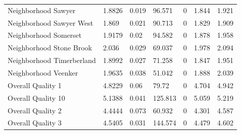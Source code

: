 \documentclass{article}
\begin{document}
\begin{table}[]
\begin{tabular}{lllllll}
		Neighborhood Sawyer              & 1.8826                    & 0.019                        & 96.571                 & 0                                       & 1.844                         & 1.921                         \\
		Neighborhood Sawyer West         & 1.869                     & 0.021                        & 90.713                 & 0                                       & 1.829                         & 1.909                         \\
		Neighborhood Somerset            & 1.9179                    & 0.02                         & 94.582                 & 0                                       & 1.878                         & 1.958                         \\
		Neighborhood Stone Brook         & 2.036                     & 0.029                        & 69.037                 & 0                                       & 1.978                         & 2.094                         \\
		Neighborhood Timerberland        & 1.8992                    & 0.027                        & 71.258                 & 0                                       & 1.847                         & 1.951                         \\
		Neighborhood Veenker             & 1.9635                    & 0.038                        & 51.042                 & 0                                       & 1.888                         & 2.039                         \\
		Overall Quality 1                & 4.8229                    & 0.06                         & 79.72                  & 0                                       & 4.704                         & 4.942                         \\
		Overall Quality 10               & 5.1388                    & 0.041                        & 125.813                & 0                                       & 5.059                         & 5.219                         \\
		Overall Quality 2                & 4.4444                    & 0.073                        & 60.932                 & 0                                       & 4.301                         & 4.587                         \\
		Overall Quality 3                & 4.5405                    & 0.031                        & 144.574                & 0                                       & 4.479                         & 4.602                         \\

\end{tabular}
\end{table}
\end{document}
